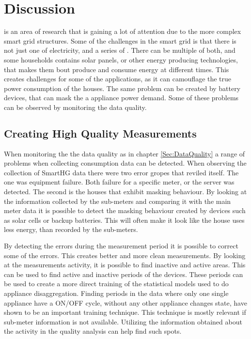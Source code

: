 \chapter{Discussion}

 is an area of research that is gaining a lot of attention due to the more complex smart grid structures. Some of the challenges in the smart grid is that there is not just one  of electricity, and a series of . There can be multiple of both, and some households contains solar panels, or other energy producing technologies, that makes them bout produce and consume energy at different times. This creates challenges for some of the  applications, as it can camouflage the true power consumption of the houses. The same problem can be created by battery devices, that can mask the a appliance power demand. Some of these problems can be observed by monitoring the data quality.

\section{Creating High Quality Measurements}
When monitoring the the data quality as in chapter \ref{Sec:DataQuality} a range of problems when collecting consumption data can be detected. When observing the collection of SmartHG data there were two error gropes that reviled itself. The one was equipment failure. Both failure for a specific meter, or the server was detected. The second is the houses that exhibit masking behaviour. By looking at the information collected by the sub-meters and comparing it with the main meter data it is possible to detect the masking behaviour created by devices such as solar cells or backup batteries. This will often make it look like the house uses less energy, than recorded by the sub-meters. 

By detecting the errors during the measurement period it is possible to correct some of the errors. This creates better and more clean measurements. By looking at the measurements activity, it is possible to find inactive and active areas. This can be used to find active and inactive periods of the devices. These periods can be used to create a more direct training of the statistical models used to do appliance disaggregation. Finding periods in the data where only one single appliance have a ON/OFF cycle, without any other appliance changes state, have shown to be an important training technique. This technique is mostly relevant if sub-meter information is not available. Utilizing the information obtained about the activity in the quality analysis can help find such spots.

